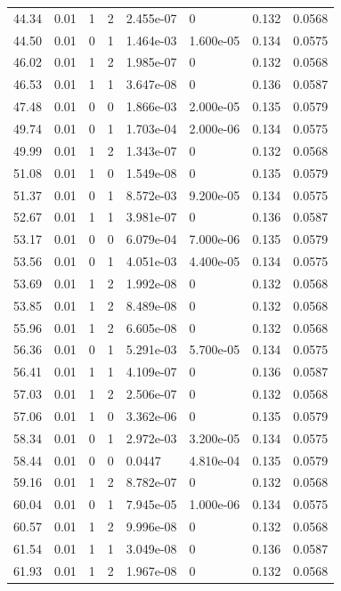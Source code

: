 \documentclass[preview]{standalone}
\begin{document}
{{{\begin{tabular}{L{1.2cm}C{1.2cm} C{0.3cm}C{0.5cm} C{1.4cm}C{1.4cm} C{1.4cm}C{1.4cm}}
  44.34  &  0.01  & 1     &  2 &  2.455e-07  & 0  & 0.132 &  0.0568   \\ 
  44.50  &  0.01  & 0     &  1 &  1.464e-03  & 1.600e-05  & 0.134 &  0.0575   \\ 
  46.02  &  0.01  & 1     &  2 &  1.985e-07  & 0  & 0.132 &  0.0568   \\ 
  46.53  &  0.01  & 1     &  1 &  3.647e-08  & 0  & 0.136 &  0.0587   \\ 
  47.48  &  0.01  & 0     &  0 &  1.866e-03  & 2.000e-05  & 0.135 &  0.0579   \\ 
  49.74  &  0.01  & 0     &  1 &  1.703e-04  & 2.000e-06  & 0.134 &  0.0575   \\ 
  49.99  &  0.01  & 1     &  2 &  1.343e-07  & 0  & 0.132 &  0.0568   \\ 
  51.08  &  0.01  & 1     &  0 &  1.549e-08  & 0  & 0.135 &  0.0579   \\ 
  51.37  &  0.01  & 0     &  1 &  8.572e-03  & 9.200e-05  & 0.134 &  0.0575   \\ 
  52.67  &  0.01  & 1     &  1 &  3.981e-07  & 0  & 0.136 &  0.0587   \\ 
  53.17  &  0.01  & 0     &  0 &  6.079e-04  & 7.000e-06  & 0.135 &  0.0579   \\ 
  53.56  &  0.01  & 0     &  1 &  4.051e-03  & 4.400e-05  & 0.134 &  0.0575   \\ 
  53.69  &  0.01  & 1     &  2 &  1.992e-08  & 0  & 0.132 &  0.0568   \\ 
  53.85  &  0.01  & 1     &  2 &  8.489e-08  & 0  & 0.132 &  0.0568   \\ 
  55.96  &  0.01  & 1     &  2 &  6.605e-08  & 0  & 0.132 &  0.0568   \\ 
  56.36  &  0.01  & 0     &  1 &  5.291e-03  & 5.700e-05  & 0.134 &  0.0575   \\ 
  56.41  &  0.01  & 1     &  1 &  4.109e-07  & 0  & 0.136 &  0.0587   \\ 
  57.03  &  0.01  & 1     &  2 &  2.506e-07  & 0  & 0.132 &  0.0568   \\ 
  57.06  &  0.01  & 1     &  0 &  3.362e-06  & 0  & 0.135 &  0.0579   \\ 
  58.34  &  0.01  & 0     &  1 &  2.972e-03  & 3.200e-05  & 0.134 &  0.0575   \\ 
  58.44  &  0.01  & 0     &  0 &  0.0447  & 4.810e-04  & 0.135 &  0.0579   \\ 
  59.16  &  0.01  & 1     &  2 &  8.782e-07  & 0  & 0.132 &  0.0568   \\ 
  60.04  &  0.01  & 0     &  1 &  7.945e-05  & 1.000e-06  & 0.134 &  0.0575   \\ 
  60.57  &  0.01  & 1     &  2 &  9.996e-08  & 0  & 0.132 &  0.0568   \\ 
  61.54  &  0.01  & 1     &  1 &  3.049e-08  & 0  & 0.136 &  0.0587   \\ 
  61.93  &  0.01  & 1     &  2 &  1.967e-08  & 0  & 0.132 &  0.0568   \\ 
\hline 
\end{tabular} 

}}}
\end{document}
